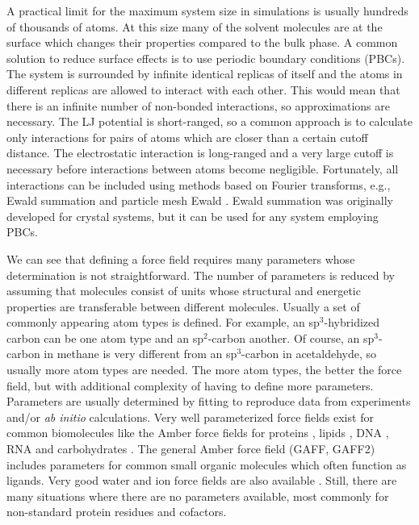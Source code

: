 A practical limit for the maximum system size in simulations is usually hundreds of thousands of atoms. At this size many of the solvent molecules are at the surface which changes their properties compared to the bulk phase. A common solution to reduce surface effects is to use periodic boundary conditions (PBCs). The system is surrounded by infinite identical replicas of itself and the atoms in different replicas are allowed to interact with each other. This would mean that there is an infinite number of non-bonded interactions, so approximations are necessary. The LJ potential is short-ranged, so a common approach is to calculate only interactions for pairs of atoms which are closer than a certain cutoff distance. The electrostatic interaction is long-ranged and a very large cutoff is necessary before interactions between atoms become negligible. Fortunately, all interactions can be included using methods based on Fourier transforms, e.g., Ewald summation and particle mesh Ewald \cite{Petersen1995}. Ewald summation was originally developed for crystal systems, but it can be used for any system employing PBCs. 

We can see that defining a force field requires many parameters whose determination is not straightforward. The number of parameters is reduced by assuming that molecules consist of units whose structural and energetic properties are transferable between different molecules. Usually a set of commonly appearing atom types is defined. For example, an sp$^3$-hybridized carbon can be one atom type and an sp$^2$-carbon another. Of course, an sp$^3$-carbon in methane is very different from an sp$^3$-carbon in acetaldehyde, so usually more atom types are needed. The more atom types, the better the force field, but with additional complexity of having to define more parameters. Parameters are usually determined by fitting to reproduce data from experiments and/or \textit{ab initio} calculations. Very well parameterized force fields exist for common biomolecules like the Amber force fields for proteins \cite{Tian2020}, lipids \cite{Dickson2022}, DNA \cite{Murillo2016}, RNA \cite{Zgarbova2011} and carbohydrates \cite{Kirschner2008}. The general Amber force field (GAFF, GAFF2) \cite{He2020} includes parameters for common small organic molecules which often function as ligands. Very good water and ion force fields are also available \cite{Xiong2020,Sengupta2021}. Still, there are many situations where there are no parameters available, most commonly for non-standard protein residues and cofactors. 

